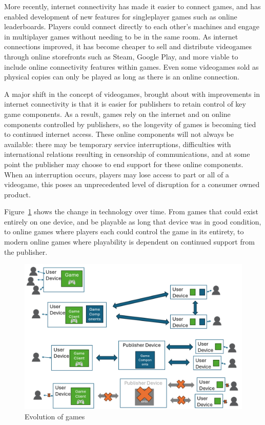 More recently, internet connectivity has made it easier to connect games, and has enabled development of new features for singleplayer games such as online leaderboards.
Players could connect directly to each other's machines and engage in multiplayer games without needing to be in the same room.
As internet connections improved, it has become cheaper to sell and distribute videogames through online storefronts such as Steam, Google Play,
and more viable to include online connectivity features within games.
Even some videogames sold as physical copies can only be played as long as there is an online connection.

A major shift in the concept of videogames, brought about with improvements in internet connectivity is that it is easier for publishers to retain control of key game components.
As a result, games rely on the internet and on online components controlled by publishers, so the longevity of games is becoming tied to continued internet access.
These online components will not always be available:
there may be temporary service interruptions,
difficulties with international relations resulting in censorship of communications,
and at some point the publisher may choose to end support for these online components.
When an interruption occurs, players may lose access to part or all of a videogame,
this poses an unprecedented level of disruption for a consumer owned product.

Figure~\ref{fig:evolution} shows the change in technology over time.
From games that could exist entirely on one device, and be playable as long that device was in good condition,
to online games where players each could control the game in its entirety,
to modern online games where playability is dependent on continued support from the publisher.

\begin{figure}
    \caption{Evolution of games}%
    \label{fig:evolution}
    \includegraphics[width=1\textwidth]{images/evolution}
\end{figure}

